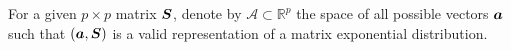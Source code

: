 For a given \(p\times p\) matrix \(\boldsymbol S\), denote by \(\mathcal A\subset \mathbb R^p\) the space of all possible vectors \(\boldsymbol a\) such that \((\boldsymbol a, \boldsymbol S)\) is a valid representation of a matrix exponential distribution. %



%
